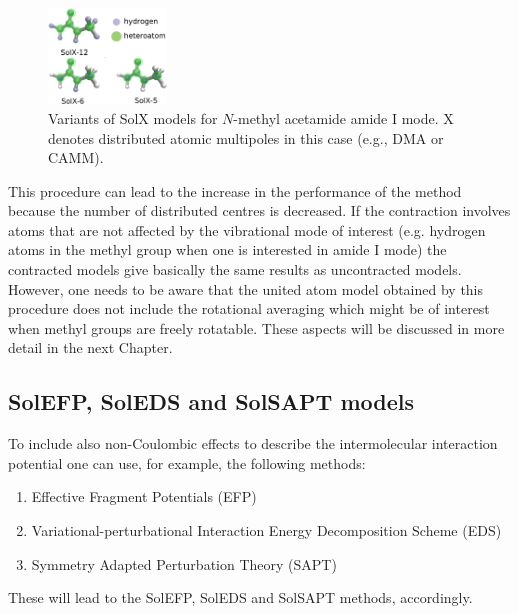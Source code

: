 \documentclass[a4paper,titlepage,twoside,fleqn,12pt]{book}
\begin{document}
\begin{refsection}
\begin{figure}[b!]
\begin{center}
    \includegraphics[width=0.28\textwidth]{SolXn.eps}
  \end{center}
  \caption{Variants of SolX models for $N$-methyl acetamide amide I mode.
X denotes distributed atomic multipoles in this case (e.g., DMA or CAMM).\label{f:solxn}}
\end{figure}
%
\noindent This procedure can lead to the increase in the performance
of the method because the number of distributed centres
is decreased. If the contraction involves atoms that 
are not affected by the vibrational mode of interest (e.g. 
hydrogen atoms in the methyl group when one is interested
in amide I mode) the contracted models give basically 
the same results as uncontracted models. However, one needs to 
be aware that the united atom model obtained by this procedure
does not include the rotational averaging which might be of
interest when methyl groups are freely rotatable. These aspects 
will be discussed in more detail in the next Chapter. 

\subsection{SolEFP, SolEDS and SolSAPT models\label{s:solefp-soleds-solsapt}}

To include also non\hyp{}Coulombic effects to describe 
the intermolecular interaction potential one can use, for example,
the following methods:
%
\begin{enumerate}
  \item Effective Fragment 
Potentials \citep{Day.Jensen.Gordon.Webb.Stevens.Krauss.Garmer.Basch.Cohen.JCP.1996,
Flick.Kosenkov.Hohenstein.Sherrill.Slipchenko.JCTC.2012} (EFP)
  \item Variational\hyp{}perturbational Interaction Energy Decomposition
Scheme \citep{Sokalski.Roszak.Pecul.CPL.1988,
Chalasinski.Szczesniak.MolPhys.1988,Cybulski.Chalasinski.Moszynski.JCP.1990,
Gora.Bartkowiak.Roszak.Leszczynski.JCP.2004} (EDS)
  \item Symmetry Adapted Perturbation Theory \citep{Jeziorski.Moszynski.Szalewicz.ChemRev.1994} (SAPT)
\end{enumerate}
%
These will lead to the SolEFP, SolEDS and SolSAPT methods, accordingly. 


\end{refsection}
\end{document}
